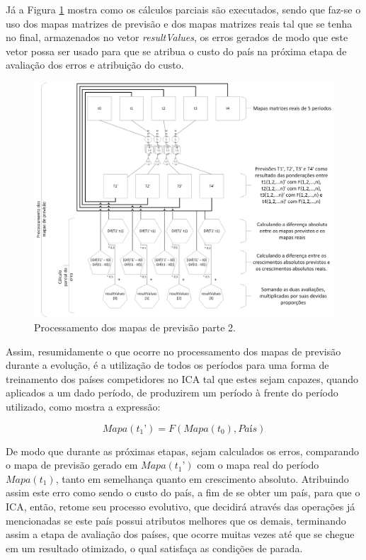 Já a Figura \ref{fig:ForecastEvalPart1}  mostra como os cálculos parciais são executados, sendo que faz-se o uso dos mapas matrizes de previsão e dos mapas matrizes reais tal que se tenha no final, armazenados no vetor \emph{resultValues}, os erros gerados de modo que este vetor possa ser usado para que se atribua o custo do país na próxima etapa de avaliação dos erros e atribuição do custo.

\begin{figure}[h]
	\centering	\includegraphics[scale=0.55]{Figuras/Ilustrations-ForecastEvalPart1.png}
	\caption{Processamento dos mapas de previsão parte 2.}
	\label{fig:ForecastEvalPart1}
\end{figure}

Assim, resumidamente o que ocorre no processamento dos mapas de previsão durante a evolução, é a utilização de todos os períodos para uma forma de treinamento dos países competidores no ICA tal que estes sejam capazes, quando aplicados a um dado período, de produzirem um período à frente do período utilizado, como mostra a expressão:

\begin{equation}
\label{eq:forecastError}
Mapa(t_1’) = F(Mapa(t_0), País)
\end{equation}

De modo que durante as próximas etapas, sejam calculados os erros, comparando o mapa de previsão gerado em \(Mapa(t_1’)\) com o mapa real do período \(Mapa(t_1)\), tanto em semelhança quanto em crescimento absoluto. Atribuindo assim este erro como sendo o custo do país, a fim de se obter um país, para que o ICA, então, retome seu processo evolutivo, que decidirá através das operações já mencionadas se este país possui atributos melhores que os demais, terminando assim a etapa de avaliação dos países, que ocorre muitas vezes até que se chegue em um resultado otimizado, o qual satisfaça as condições de parada.




